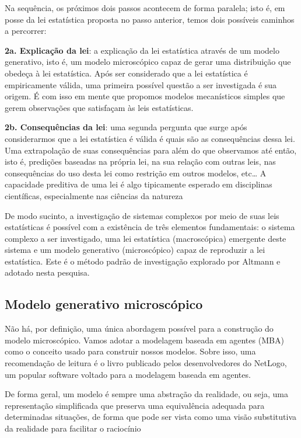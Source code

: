 Na sequência, os próximos dois passos acontecem de forma paralela; isto é, em posse da lei estatística proposta no passo anterior, temos dois possíveis caminhos a percorrer:

\textbf{2a. Explicação da lei}: a explicação da lei estatística através de um modelo generativo, isto é, um modelo microscópico capaz de gerar uma distribuição que obedeça à lei estatística. Após ser considerado que a lei estatística é empiricamente válida, uma primeira possível questão a ser investigada é sua origem. É com isso em mente que propomos modelos mecanísticos simples que gerem observações que satisfaçam às leis estatísticas. 

\textbf{2b. Consequências da lei}: uma segunda pergunta que surge após considerarmos que a lei estatística é válida é quais são as consequências dessa lei. Uma extrapolação de suas consequências para além do que observamos até então, isto é, predições baseadas na própria lei, na sua relação com outras leis, nas consequências do uso desta lei como restrição em outros modelos, etc… A capacidade preditiva de uma lei é algo tipicamente esperado em disciplinas científicas, especialmente nas ciências da natureza

De modo sucinto, a investigação de sistemas complexos por meio de suas leis estatísticas é possível com a existência de três elementos fundamentais: o sistema complexo a ser investigado, uma lei estatística (macroscópica) emergente deste sistema e um modelo generativo (microscópico) capaz de reproduzir a lei estatística. Este é o método padrão de investigação explorado por Altmann e adotado nesta pesquisa.

\subsection{Modelo generativo microscópico}

Não há, por definição, uma única abordagem possível para a construção do modelo microscópico. Vamos adotar a modelagem baseada em agentes (MBA) como o conceito usado para construir nossos modelos. Sobre isso, uma recomendação de leitura é o livro publicado pelos desenvolvedores do NetLogo\cite{10.2307/j.ctt17kk851}, um popular software voltado para a modelagem baseada em agentes.

De forma geral, um modelo é sempre uma abstração da realidade, ou seja, uma representação simplificada que preserva uma equivalência adequada para determinadas situações, de forma que pode ser vista como uma visão substitutiva da realidade para facilitar o raciocínio %

